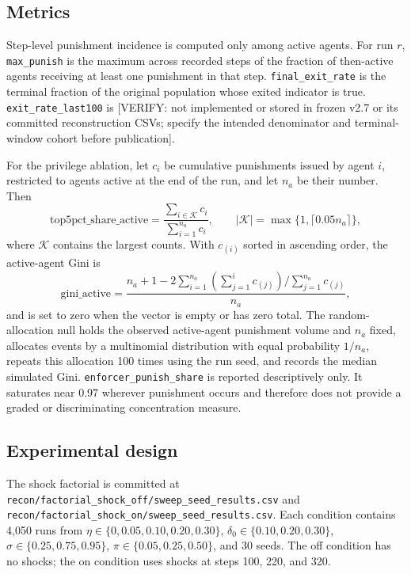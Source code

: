 \documentclass[12pt]{article}
\begin{document}
\subsection{Metrics}

Step-level punishment incidence is computed only among active agents. For run \(r\), \texttt{max\_punish} is the maximum across recorded steps of the fraction of then-active agents receiving at least one punishment in that step. \texttt{final\_exit\_rate} is the terminal fraction of the original population whose exited indicator is true. \texttt{exit\_rate\_last100} is [VERIFY: not implemented or stored in frozen v2.7 or its committed reconstruction CSVs; specify the intended denominator and terminal-window cohort before publication].

For the privilege ablation, let \(c_i\) be cumulative punishments issued by agent \(i\), restricted to agents active at the end of the run, and let \(n_a\) be their number. Then
\begin{equation}
 \mathrm{top5pct\_share\_active}=\frac{\sum_{i\in\mathcal{K}}c_i}{\sum_{i=1}^{n_a}c_i},\qquad |\mathcal{K}|=\max\{1,\lceil0.05n_a\rceil\},
\end{equation}
where \(\mathcal{K}\) contains the largest counts. With \(c_{(i)}\) sorted in ascending order, the active-agent Gini is
\begin{equation}
 \mathrm{gini\_active}=\frac{n_a+1-2\sum_{i=1}^{n_a}\left(\sum_{j=1}^{i}c_{(j)}\right)/\sum_{j=1}^{n_a}c_{(j)}}{n_a},
\end{equation}
and is set to zero when the vector is empty or has zero total. The random-allocation null holds the observed active-agent punishment volume and \(n_a\) fixed, allocates events by a multinomial distribution with equal probability \(1/n_a\), repeats this allocation 100 times using the run seed, and records the median simulated Gini. \texttt{enforcer\_punish\_share} is reported descriptively only. It saturates near 0.97 wherever punishment occurs and therefore does not provide a graded or discriminating concentration measure.

\subsection{Experimental design}

The shock factorial is committed at \texttt{recon/factorial\_shock\_off/sweep\_seed\_results.csv} and \texttt{recon/factorial\_shock\_on/sweep\_seed\_results.csv}. Each condition contains 4,050 runs from \(\eta\in\{0,0.05,0.10,0.20,0.30\}\), \(\delta_0\in\{0.10,0.20,0.30\}\), \(\sigma\in\{0.25,0.75,0.95\}\), \(\pi\in\{0.05,0.25,0.50\}\), and 30 seeds. The off condition has no shocks; the on condition uses shocks at steps 100, 220, and 320.
\end{document}
